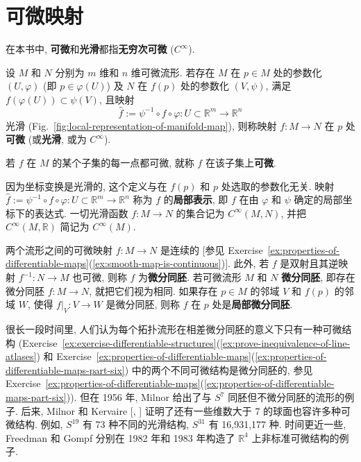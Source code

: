 \section{可微映射}\label{sec:differentiable-maps}

在本书中, \textbf{可微}和\textbf{光滑}都指\textbf{无穷次可微} ($C^\infty$).

\begin{RiemannDefinition}\label{def:differentiable-map}
设 $M$ 和 $N$ 分别为 $m$ 维和 $n$ 维可微流形. 若存在 $M$ 在 $p\in M$ 处的参数化 $(U,\varphi)$ (即 $p\in\varphi(U)$) 及 $N$ 在 $f(p)$ 处的参数化 $(V,\psi)$, 满足 $f(\varphi(U))\subset\psi(V)$, 且映射
\[
  \widehat f:=\psi^{-1}\circ f\circ\varphi:U\subset\mathbb{R}^m\to\mathbb{R}^n
\]
光滑 (Fig.~\ref{fig:local-representation-of-manifold-map}), 则称映射 $f:M\to N$ 在 $p$ 处\textbf{可微} (或\textbf{光滑}, 或为 \textbf{$C^\infty$}).

若 $f$ 在 $M$ 的某个子集的每一点都可微, 就称 $f$ 在该子集上\textbf{可微}.
\end{RiemannDefinition}


因为坐标变换是光滑的, 这个定义与在 $f(p)$ 和 $p$ 处选取的参数化无关. 映射 $\widehat f:=\psi^{-1}\circ f\circ\varphi:U\subset\mathbb{R}^m\to\mathbb{R}^n$ 称为 $f$ 的\textbf{局部表示}, 即 $f$ 在由 $\varphi$ 和 $\psi$ 确定的局部坐标下的表达式. 一切光滑函数 $f:M\to N$ 的集合记为 $C^\infty(M,N)$, 并把 $C^\infty(M,\mathbb{R})$ 简记为 $C^\infty(M)$.

两个流形之间的可微映射 $f:M\to N$ 是连续的 [参见 Exercise~\ref{ex:properties-of-differentiable-maps}(\ref{ex:smooth-map-is-continuous})]. 此外, 若 $f$ 是双射且其逆映射 $f^{-1}:N\to M$ 也可微, 则称 $f$ 为\textbf{微分同胚}. 若可微流形 $M$ 和 $N$ \textbf{微分同胚}, 即存在微分同胚 $f:M\to N$, 就把它们视为相同. 如果存在 $p\in M$ 的邻域 $V$ 和 $f(p)$ 的邻域 $W$, 使得 $f|_V:V\to W$ 是微分同胚, 则称 $f$ 在 $p$ 处是\textbf{局部微分同胚}.

很长一段时间里, 人们认为每个拓扑流形在相差微分同胚的意义下只有一种可微结构 (Exercise~\ref{ex:exercise-differentiable-structures}(\ref{ex:prove-inequivalence-of-line-atlases}) 和 Exercise~\ref{ex:properties-of-differentiable-maps}(\ref{ex:properties-of-differentiable-maps-part-six}) 中的两个不同可微结构是微分同胚的, 参见 Exercise~\ref{ex:properties-of-differentiable-maps}(\ref{ex:properties-of-differentiable-maps-part-six})). 但在 1956 年, Milnor  给出了与 $S^7$ 同胚但不微分同胚的流形的例子. 后来, Milnor 和 Kervaire [, ] 证明了还有一些维数大于 7 的球面也容许多种可微结构. 例如, $S^{19}$ 有 73 种不同的光滑结构, $S^{31}$ 有 16,931,177 种. 时间更近一些, Freedman  和 Gompf  分别在 1982 年和 1983 年构造了 $\mathbb{R}^4$ 上非标准可微结构的例子.

